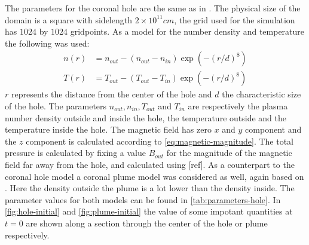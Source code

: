 The parameters for the coronal hole are the same as in \cite{coronal-hole}. 
The physical size of the domain is a square with sidelength $2\times 10^{11}cm$, the grid used for the simulation has $1024$ by $1024$ gridpoints. As a model for the number density and temperature the following was used:
\begin{equation}
	\label{eq:hole-model}
	\begin{split}
		n(r) &= n_{out} - (n_{out}-n_{in})\exp \left( -(r/d)^8 \right)\\
		T(r) &= T_{out} - (T_{out}-T_{in})\exp \left( -(r/d)^8 \right) 
	\end{split}
\end{equation}
$r$ represents the distance from the center of the hole and $d$ the characteristic size of the hole. 
The parameters $n_{out}, n_{in}, T_{out}$ and $T_{in}$ are respectively the plasma number density outside and inside the hole, the temperature outside and the temperature inside the hole. 
The magnetic field has zero $x$ and $y$ component and the $z$ component is calculated according to \cref{eq:magnetic-magnitude}.
The total pressure is calculated by fixing a value $B_{out}$ for the magnitude of the magnetic field far away from the hole, and calculated using [ref].
As a counterpart to the coronal hole model a coronal plume model was considered as well, again based on \cite{coronal-hole}.
Here the density outside the plume is a lot lower than the density inside.
The parameter values for both models can be found in \cref{tab:parameters-hole}.
In \cref{fig:hole-initial} and \cref{fig:plume-initial} the value of some impotant quantities at $t=0$ are shown along a section through the center of the hole or plume respectively.

